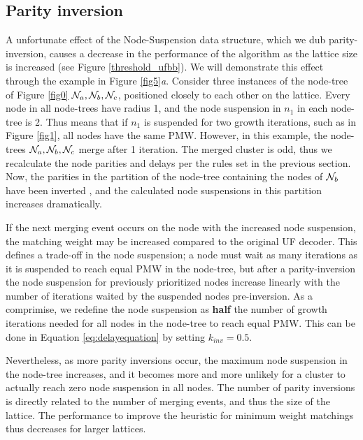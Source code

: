 \subsection{Parity inversion}

A unfortunate effect of the Node-Suspension data structure, which we dub parity-inversion, causes a decrease in the performance of the algorithm as the lattice size is increased (see Figure \ref{threshold_ufbb}). We will demonstrate this effect through the example in Figure \ref{fig5}\emph{a}. Consider three instances of the node-tree of Figure \ref{fig0} $\mathcal{N}_a, \mathcal{N}_b, \mathcal{N}_c$, positioned closely to each other on the lattice. Every node in all node-trees have radius 1, and the node suspension in $n_1$ in each node-tree is 2. Thus means that if $n_1$ is suspended for two growth iterations, such as in Figure \ref{fig1}, all nodes have the same PMW. However, in this example, the node-trees $\mathcal{N}_a, \mathcal{N}_b, \mathcal{N}_c$ merge after 1 iteration. The merged cluster is odd, thus we recalculate the node parities and delays per the rules set in the previous section. Now, the parities in the partition of the node-tree containing the nodes of $\mathcal{N}_b$ have been inverted , and the calculated node suspensions in this partition increases dramatically. 

If the next merging event occurs on the node with the increased node suspension, the matching weight may be increased compared to the original UF decoder. This defines a trade-off in the node suspension; a node must wait as many iterations as it is suspended to reach equal PMW in the node-tree, but after a parity-inversion the node suspension for previously prioritized nodes increase linearly with the number of iterations waited by the suspended nodes pre-inversion. As a comprimise, we redefine the node suspension as \textbf{half} the number of growth iterations needed for all nodes in the node-tree to reach equal PMW. This can be done in Equation \eqref{eq:delayequation} by setting $k_{inv}=0.5$.

Nevertheless, as more parity inversions occur, the maximum node suspension in the node-tree increases, and it becomes more and more unlikely for a cluster to actually reach zero node suspension in all nodes. The number of parity inversions is directly related to the number of merging events, and thus the size of the lattice. The performance to improve the heuristic for minimum weight matchings thus decreases for larger lattices. 

